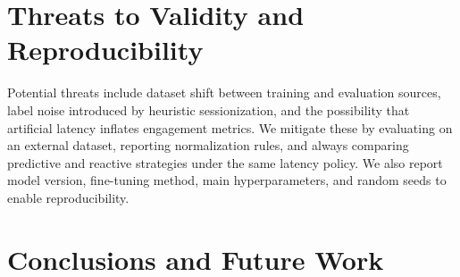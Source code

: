 \documentclass[10pt,a4paper,twocolumn]{article}
\begin{document}

\section{Threats to Validity and\\ Reproducibility}
\label{sec:threats-validity}
Potential threats include dataset shift between training and evaluation sources, label noise introduced by heuristic sessionization, and the possibility that artificial latency inflates engagement metrics. We mitigate these by evaluating on an external dataset, reporting normalization rules, and always comparing predictive and reactive strategies under the same latency policy. We also report model version, fine-tuning method, main hyperparameters, and random seeds to enable reproducibility.

\section{Conclusions and Future Work}



\end{document}
